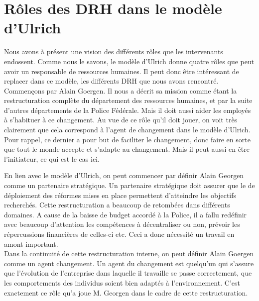 \section{Rôles des DRH dans le modèle d'Ulrich}

Nous avons à présent une vision des différents rôles que les intervenants endossent. Comme nous le savons, le modèle d'Ulrich donne quatre rôles que peut avoir un responsable de ressources humaines. Il peut donc être intéressant de replacer dans ce modèle, les différents DRH que nous avons rencontré. \\

Commençons par Alain Goergen. Il nous a décrit sa mission comme étant la restructuration complète du département des ressources humaines, et par la suite d'autres départements de la Police Fédérale. Mais il doit aussi aider les employés à s'habituer à ce changement. Au vue de ce rôle qu'il doit jouer, on voit très clairement que cela correspond à l'\og agent de changement \fg{} dans le modèle d'Ulrich. Pour rappel, ce dernier a pour but de faciliter le changement, donc faire en sorte que tout le monde accepte et s'adapte au changement. Mais il peut aussi en être l'initiateur, ce qui est le cas ici.

En lien avec le modèle d'Ulrich, on peut commencer par définir Alain Georgen comme un partenaire stratégique. Un partenaire stratégique doit assurer que le de déploiement des réformes mises en place permettent d'atteindre les objectifs recherchés. Cette restructuration a beaucoup de retombées dans différents domaines. A cause de la baisse de budget accordé à la Police, il a fallu redéfinir avec beaucoup d'attention les compétences à décentraliser ou non, prévoir les répercussions financières de celles-ci etc. Ceci a donc nécessité un travail en amont important.\\

Dans la continuité de cette restructuration interne, on peut définir Alain Goergen comme un agent changement. Un agent du changement est quelqu'un qui s'assure que l'évolution de l'entreprise dans laquelle il travaille se passe correctement, que les comportements des individus soient bien adaptés à l'environnement. C'est exactement ce rôle qu'a joue M. Georgen dans le cadre de cette restructuration. 


